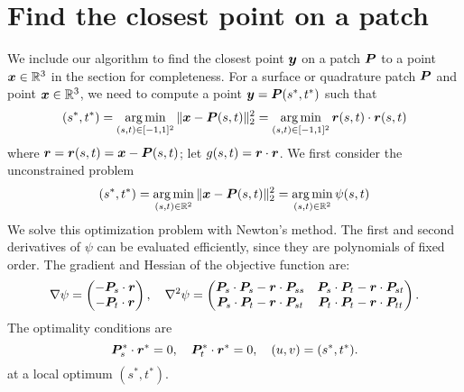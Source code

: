 
\section{Find the closest point on a patch  \label{app:closest_point}}
We include our algorithm to find the closest point ${\bm{y}}$ on a patch ${\bm{P}}$ to a point ${\bm{x}} \in \mathbb{R}^3$ in the section for completeness.
For a surface or quadrature patch ${\bm{P}}$ and point ${\bm{x}} \in \mathbb{R}^3$, 
we need to compute a point ${\bm{y}} = {\bm{P}}(s^*, t^*)$ such that
\begin{equation}
  (s^*, t^*) = \operatorname*{arg\,min}_{(s,t) \in [-1,1]^2} \|{\bm{x}} - {\bm{P}}(s,t)\|_2^2 =  \operatorname*{arg\,min}_{(s,t) \in [-1,1]^2} {\bm{r}}(s,t)\cdot {\bm{r}}(s,t)
\end{equation}
where $ {\bm{r}} = {\bm{r}}(s,t) = {\bm{x}} - {\bm{P}}(s,t)$; let $g(s,t) = {\bm{r}}\cdot {\bm{r}}$.
We first consider the unconstrained problem
\begin{equation}
    (s^*, t^*) = \operatorname*{arg\,min}_{(s,t) \in \mathbb{R}^2} \|{\bm{x}} - {\bm{P}}(s,t)\|_2^2  = \operatorname*{arg\,min}_{(s,t) \in \mathbb{R}^2} \psi(s,t) 
\end{equation}
We solve this optimization problem with Newton's method.
The first and second derivatives of $\psi$ can be evaluated efficiently, since they are polynomials of fixed order.
The gradient and Hessian of the objective function are:
\begin{equation}
  \nabla \psi  =
  \begin{pmatrix}
    -{\bm{P}}_s\cdot {\bm{r}} \\
    -{\bm{P}}_t\cdot {\bm{r}} \\
  \end{pmatrix}, \quad
  \nabla^2 \psi = 
\begin{pmatrix}
  {\bm{P}}_s \cdot {\bm{P}}_s - {\bm{r}}\cdot {\bm{P}}_{ss} & {\bm{P}}_s \cdot {\bm{P}}_t - {\bm{r}}\cdot {\bm{P}}_{st}\\
  {\bm{P}}_s \cdot {\bm{P}}_t - {\bm{r}}\cdot {\bm{P}}_{st} & {\bm{P}}_t \cdot {\bm{P}}_t - {\bm{r}}\cdot {\bm{P}}_{tt}  \\
\end{pmatrix}.
  \label{equ:grad-hess-newton}
\end{equation}
The optimality conditions are 
\begin{equation}
{\bm{P}}_s^* \cdot {\bm{r}}^* = 0, \quad {\bm{P}}_t^* \cdot {\bm{r}}^* = 0, \quad (u,v) = (s^*, t^*).
  \label{eq:kkt}
\end{equation}
at a local optimum $(s^*, t^*)$.

